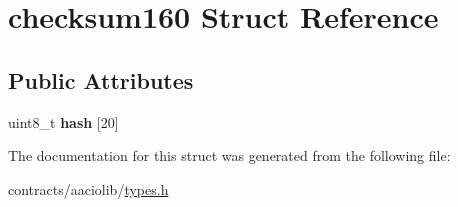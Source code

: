 \hypertarget{structchecksum160}{}\section{checksum160 Struct Reference}
\label{structchecksum160}
\subsection*{Public Attributes}
\begin{DoxyCompactItemize}
\item 
\mbox{\label{structchecksum160_aa8ef88d016694f58b2a6b35783267f9c}} 
uint8\+\_\+t {\bfseries hash} \mbox{[}20\mbox{]}
\end{DoxyCompactItemize}


The documentation for this struct was generated from the following file\+:\begin{DoxyCompactItemize}
\item 
contracts/aaciolib/\mbox{\hyperlink{contracts_2aaciolib_2types_8h}{types.\+h}}\end{DoxyCompactItemize}
